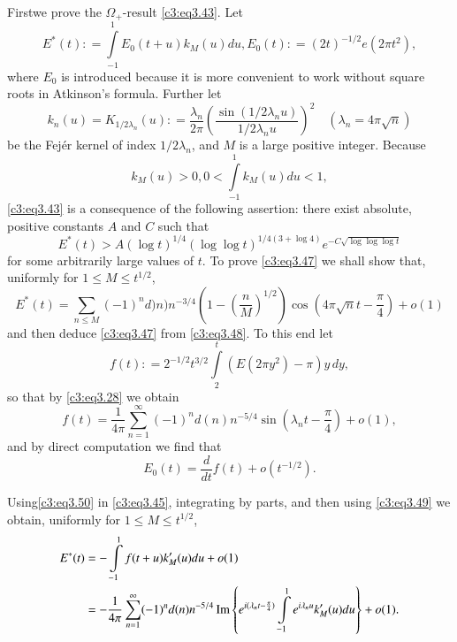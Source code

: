 \medskip
{}  First\pageoriginale we prove the
$\Omega_+$-result \eqref{c3:eq3.43}.  Let
\begin{equation}
  E^* (t) : = \int\limits_{-1}^1 E_0 (t+u) k_M (u) du, E_0 (t) : = (2
  t)^{-1/2} e(2 \pi t^2),\label{c3:eq3.45}
\end{equation}
 where $E_0$ is introduced because it is more convenient to work
 without square roots in Atkinson's formula. Further let
\begin{equation}
  k_n (u) = K_{1/2\lambda_n} (u) : = \frac{\lambda_n}{2 \pi}
  \left(\frac{\sin (1/2 \lambda_n u)}{1/2 \lambda_n u} \right)^2 \quad
  (\lambda_n = 4 \pi \sqrt{n})
\end{equation}
be the Fej\'er kernel of index $1/2 \lambda_n$, and $M$ is a large
positive integer. Because
$$
k_M (u) > 0, 0 < \int\limits_{-1}^1 k_M (u) du < 1,
$$
\eqref{c3:eq3.43} is a consequence of the following assertion: there
exist absolute, positive constants $A$ and $C$ such that
\begin{equation}
  E^* (t) > A (\log t)^{1/4} (\log \log t)^{1/4(3 + \log 4)} e^{-
    C\sqrt{\log \log \log t}}\label{c3:eq3.47}
\end{equation}
for some arbitrarily large values of $t$. To prove \eqref{c3:eq3.47}
we shall show that, uniformly for $1 \leq M \leq t^{1/2}$, 
{\fontsize{10pt}{12pt}\selectfont
\begin{equation}
  E^* (t) = \sum_{n \leq M} (-1)^n d)n) n^{-3/4} \left(1- \left(
  \frac{n}{M}\right)^{1/2} \right) \cos \left(4 \pi \sqrt{n} t-
  \frac{\pi}{4} \right)  + o(1) \label{c3:eq3.48}
\end{equation}}
and then deduce \eqref{c3:eq3.47} from \eqref{c3:eq3.48}. To this end
let
$$
f(t) : = 2^{-1/2}t^{3/2} \int\limits_2^t (E (2 \pi y^2)- \pi)y\, dy,
$$
so that by \eqref{c3:eq3.28} we obtain
\begin{equation}
  f(t) = \frac{1}{4 \pi} \sum_{n=1}^\infty (-1)^n d(n) n^{-5/4} \sin
  (\lambda_n t - \frac{\pi}{4})+ o(1),\label{c3:eq3.49}
\end{equation}
and by direct computation we find that
\begin{equation}
  E_0 (t) = \frac{d}{dt} f(t) + o(t^{-1/2}).\label{c3:eq3.50}
\end{equation}

Using\pageoriginale \eqref{c3:eq3.50} in \eqref{c3:eq3.45},
integrating by parts, and then using \eqref{c3:eq3.49} we obtain,
uniformly for $1 \leq M \leq t^{1/2}$,
\begin{align*}
  E^* (t) & = - \int\limits_{-1}^1 f(t+u) k'_M (u) du + o(1)\\
  & = - \frac{1}{4 \pi} \sum_{n=1}^\infty (-1)^n d(n) n^{-5/4} \operatorname{Im}
  \left\{e^{i (\lambda_n t- \frac{\pi}{4})} \int\limits_{-1}^1 e^{i
    \lambda_n u} k'_M (u) du \right\} + o(1).
\end{align*}

